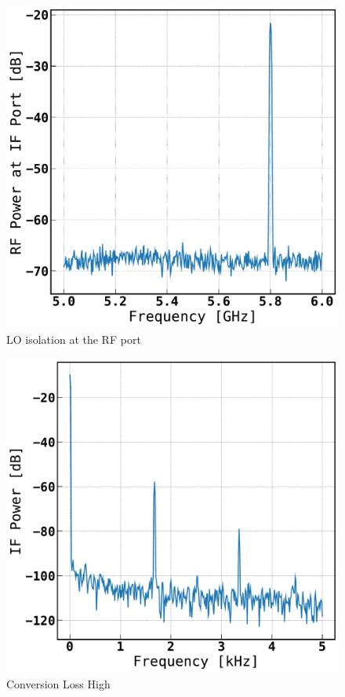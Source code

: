 \documentclass[reprint, aps, prl]{revtex4-1}
\begin{document}
\begin{figure}[!htbp]
    \centering
    \includegraphics[scale=0.35]{Mixer_RF.pdf}
    \caption{LO isolation at the RF port}
    \label{fig:mixerRF}
\end{figure}


\begin{figure}[!htbp]
    \centering
    \includegraphics[scale=0.35]{Mixer_1K.pdf}
    \caption{Conversion Loss High}
    \label{fig:mixer1}
\end{figure}
\end{document}
